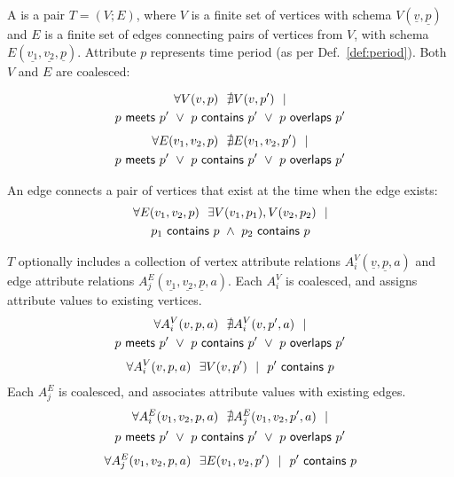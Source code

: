 \begin{definition}[TGraph]
A \tg is a pair $T=(V; E)$, where $V$ is a finite set of vertices with
schema $V(\underline{v}, \underline{p})$ and $E$ is a finite set of
edges connecting pairs of vertices from $V$, with schema
$E(\underline{v_1}, \underline{v_2}, \underline{p})$.  Attribute $p$
represents time period (as per Def.~\ref{def:period}).  Both $V$ and
$E$ are coalesced:

\begin{multline}
\forall V(v, p)~~\nexists V(v, p')~~| \\
                       p~\mathsf{meets}~p'~\lor~p~\mathsf{contains}~p'~\lor~p~\mathsf{overlaps}~p'
\label{def:tg:c2}
\end{multline}
\vspace{-0.5cm}
\begin{multline}
\forall E(v_1, v_2, p)~~\nexists E(v_1,v_2, p')~~| \\
                       p~\mathsf{meets}~p'~\lor~p~\mathsf{contains}~p'~\lor~p~\mathsf{overlaps}~p'
\label{def:tg:c3}
\end{multline}

An edge connects a pair of vertices that exist at the time when the edge exists:
\begin{multline}
\forall E(v_1, v_2, p)~~\exists V(v_1, p_1), V(v_2, p_2)~~| \\
                       p_1~\mathsf{contains}~p~\wedge~p_2~\mathsf{contains}~p
\label{def:tg:c1}
\end{multline}
\vspace{-0.5cm}

$T$ optionally includes a collection of vertex attribute relations
$A^{V}_i(\underline{v},\underline{p},a)$ and edge attribute relations
$A^{E}_j(\underline{v_1},\underline{v_2},\underline{p},a)$. Each
$A^{V}_i$ is coalesced, and assigns attribute values to existing
vertices.
\begin{multline}
\forall A^{V}_i(v, p, a)~~\nexists A^{V}_i(v, p', a)~~| \\
                       p~\mathsf{meets}~p'~\lor~p~\mathsf{contains}~p'~\lor~p~\mathsf{overlaps}~p'
\label{def:tg:c4}
\end{multline}
\begin{multline}
\forall A^{V}_i(v, p, a)~~\exists V(v,p')~~|~~p'~\mathsf{contains}~p
\label{def:tg:c5}
\end{multline}
Each $A^{E}_j$ is coalesced, and associates attribute values with
existing edges.
\begin{multline}
\forall A^{E}_i(v_1, v_2, p, a)~~\nexists A^{E}_j(v_1, v_2, p', a)~~| \\
                       p~\mathsf{meets}~p'~\lor~p~\mathsf{contains}~p'~\lor~p~\mathsf{overlaps}~p'
\label{def:tg:c6}
\end{multline}
\begin{multline}
\forall A^{E}_j(v_1, v_2, p, a)~~\exists E(v_1,v_2,p')~~|~~p'~\mathsf{contains}~p
\label{def:tg:c7}
\end{multline}

\label{def:tg}
\end{definition}

